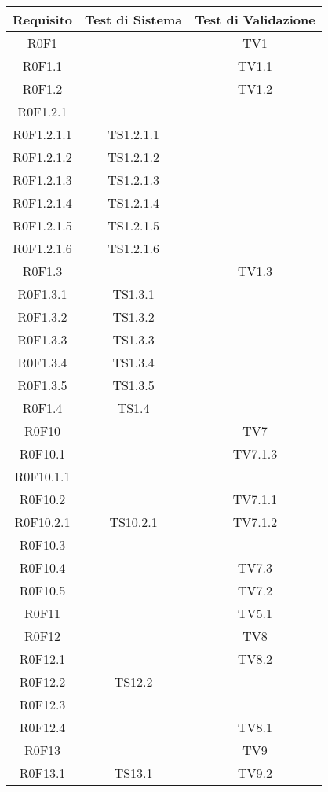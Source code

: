 \begin{center}
\begin{longtable}{|c|c|c|}
\hline

\textbf{Requisito} & \textbf{Test di Sistema} & \textbf{Test di Validazione} \\


\hline
R0F1 &  & TV1 \\
\hline
R0F1.1 &  & TV1.1 \\
\hline
R0F1.2 &  & TV1.2 \\
\hline
R0F1.2.1 &  &  \\
\hline
R0F1.2.1.1 & TS1.2.1.1   &  \\
\hline
R0F1.2.1.2 & TS1.2.1.2  &  \\
\hline
R0F1.2.1.3 & TS1.2.1.3  &  \\
\hline
R0F1.2.1.4 & TS1.2.1.4  &  \\
\hline
R0F1.2.1.5 & TS1.2.1.5  &  \\
\hline
R0F1.2.1.6 & TS1.2.1.6   &  \\
\hline
R0F1.3 &  & TV1.3 \\
\hline
R0F1.3.1 & TS1.3.1  &  \\
\hline
R0F1.3.2 & TS1.3.2  &  \\
\hline
R0F1.3.3 & TS1.3.3  &  \\
\hline
R0F1.3.4 & TS1.3.4  &  \\
\hline
R0F1.3.5 & TS1.3.5  &  \\
\hline
R0F1.4 & TS1.4  &  \\
\hline
R0F10 &  & TV7 \\
\hline
R0F10.1 &  & TV7.1.3 \\
\hline
R0F10.1.1 &  &  \\
\hline
R0F10.2 &  & TV7.1.1 \\
\hline
R0F10.2.1 & TS10.2.1  & TV7.1.2 \\
\hline
R0F10.3 &  &  \\
\hline
R0F10.4 &  & TV7.3 \\
\hline
R0F10.5 &  & TV7.2 \\
\hline
R0F11 &  & TV5.1 \\
\hline
R0F12 &  & TV8 \\
\hline
R0F12.1 &  & TV8.2 \\
\hline
R0F12.2 & TS12.2  &  \\
\hline
R0F12.3 &  &  \\
\hline
R0F12.4 &  & TV8.1 \\
\hline
R0F13 &  & TV9 \\
\hline
R0F13.1 & TS13.1  & TV9.2 \\

\end{longtable}
\end{center}
